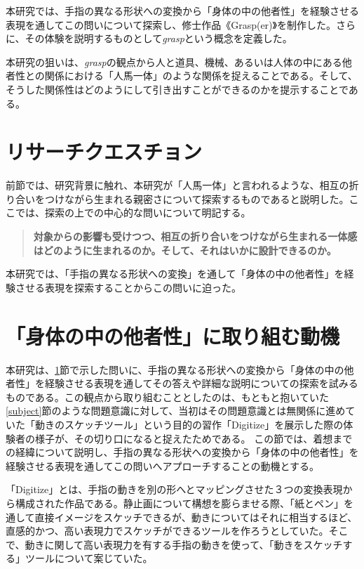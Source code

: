 本研究では、手指の異なる形状への変換から「身体の中の他者性」を経験させる表現を通してこの問いについて探索し、修士作品《Grasp(er)》を制作した。さらに、その体験を説明するものとして\textit{grasp}という概念を定義した。

本研究の狙いは、\textit{grasp}の観点から人と道具、機械、あるいは人体の中にある他者性との関係における「人馬一体」のような関係を捉えることである。そして、そうした関係性はどのようにして引き出すことができるのかを提示することである。

\section{リサーチクエスチョン}
\label{research_question}
前節では、研究背景に触れ、本研究が「人馬一体」と言われるような、相互の折り合いをつけながら生まれる親密さについて探索するものであると説明した。ここでは、探索の上での中心的な問いについて明記する。

\begin{quote}
\textbf{対象からの影響も受けつつ、相互の折り合いをつけながら生まれる一体感はどのように生まれるのか。そして、それはいかに設計できるのか。}
\end{quote}

本研究では、「手指の異なる形状への変換」を通して「身体の中の他者性」を経験させる表現を探索することからこの問いに迫った。

\section{「身体の中の他者性」に取り組む動機}
\label{prototyping_concept_making}
本研究は、\ref{research_question}節で示した問いに、手指の異なる形状への変換から「身体の中の他者性」を経験させる表現を通してその答えや詳細な説明についての探索を試みるものである。この観点から取り組むこととしたのは、もともと抱いていた\ref{subject}節のような問題意識に対して、当初はその問題意識とは無関係に進めていた「動きのスケッチツール」という目的の習作「Digitize」を展示した際の体験者の様子が、その切り口になると捉えたためである。
この節では、着想までの経緯について説明し、手指の異なる形状への変換から「身体の中の他者性」を経験させる表現を通してこの問いへアプローチすることの動機とする。

「Digitize」とは、手指の動きを別の形へとマッピングさせた３つの変換表現から構成された作品である。静止画について構想を膨らませる際、「紙とペン」を通して直接イメージをスケッチできるが、動きについてはそれに相当するほど、直感的かつ、高い表現力でスケッチができるツールを作ろうとしていた。そこで、動きに関して高い表現力を有する手指の動きを使って、「動きをスケッチする」ツールについて案じていた。

